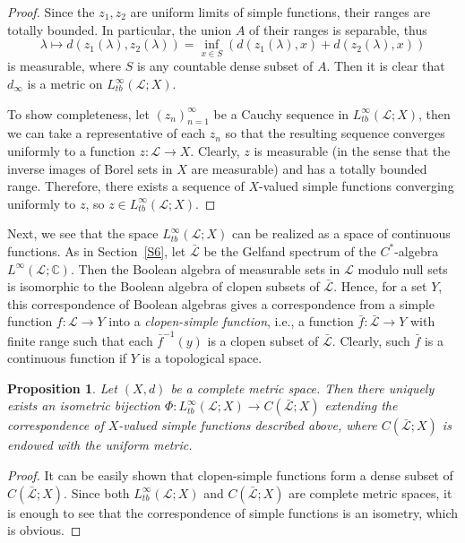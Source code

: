 \documentclass[reqno,centertags,12pt]{amsart}
\newtheorem{proposition}[theorem]{Proposition}
\theoremstyle{definition}
\numberwithin{equation}{section}
\newcommand{\seq}[1]{\left( #1 \right)}
\newcommand{\bbC}{{\mathbb{C}}}
\begin{document}
\begin{proof}
    Since the $z_{1},z_{2}$ are uniform limits of simple functions,
    their ranges are totally bounded. In particular, the union $A$ of their ranges
    is separable, thus
    \[
        \lambda\mapsto d(z_{1}(\lambda),z_{2}(\lambda))
        = \inf_{x\in S}\left(d(z_{1}(\lambda),x) + d(z_{2}(\lambda),x)\right)
    \]
    is measurable, where $S$ is any countable dense subset of $A$.
    Then it is clear that $d_{\infty}$ is a metric on $L_{tb}^{\infty}(\mathcal{L};X)$.

    To show completeness, let $\seq{z_{n}}_{n=1}^{\infty}$
    be a Cauchy sequence in $L_{tb}^{\infty}(\mathcal{L};X)$,
    then we can take a representative of each $z_{n}$ so that the resulting sequence
    converges uniformly to a function
    $z\colon\mathcal{L}\to X$. Clearly, $z$ is measurable
    (in the sense that the inverse images of Borel sets in $X$ are measurable)
    and has a totally bounded range. Therefore, there exists a sequence
    of $X$-valued simple functions converging uniformly to $z$,
    so $z\in L_{tb}^{\infty}(\mathcal{L};X)$.
\end{proof}

Next, we see that the space $L_{tb}^{\infty}(\mathcal{L};X)$ can be realized as a
space of continuous functions. As in Section~\ref{S6},
let $\bar{\mathcal{L}}$ be the Gelfand spectrum of the $C^{*}$-algebra
$L^{\infty}(\mathcal{L};\bbC)$. Then the Boolean algebra of measurable sets in $\mathcal{L}$
modulo null sets is isomorphic to the Boolean algebra of clopen subsets of $\bar{\mathcal{L}}$.
Hence, for a set $Y$, this correspondence of Boolean algebras gives a correspondence
from a simple function $f\colon\mathcal{L}\to Y$ into a \emph{clopen-simple function},
i.e., a function $\bar{f}\colon\bar{\mathcal{L}}\to Y$ with finite range such that
each $\bar{f}^{-1}(y)$ is a clopen subset of $\bar{\mathcal{L}}$.
Clearly, such $\bar{f}$ is a continuous function if $Y$ is a topological space.

\begin{proposition}\label{PC.2}
    Let $(X,d)$ be a complete metric space. Then there uniquely exists an
    isometric bijection $\Phi\colon L_{tb}^{\infty}(\mathcal{L};X) \to C(\bar{\mathcal{L}};X)$
    extending the correspondence of $X$-valued simple functions described above,
    where $C(\bar{\mathcal{L}};X)$ is endowed with the uniform metric.
\end{proposition}

\begin{proof}
    It can be easily shown that clopen-simple functions form a dense subset of
    $C(\bar{\mathcal{L}};X)$. Since both $L_{tb}^{\infty}(\mathcal{L};X)$ and
    $C(\bar{\mathcal{L}};X)$ are complete metric spaces, it is enough to see that the
    correspondence of simple functions is an isometry, which is obvious.
\end{proof}
\end{document}
